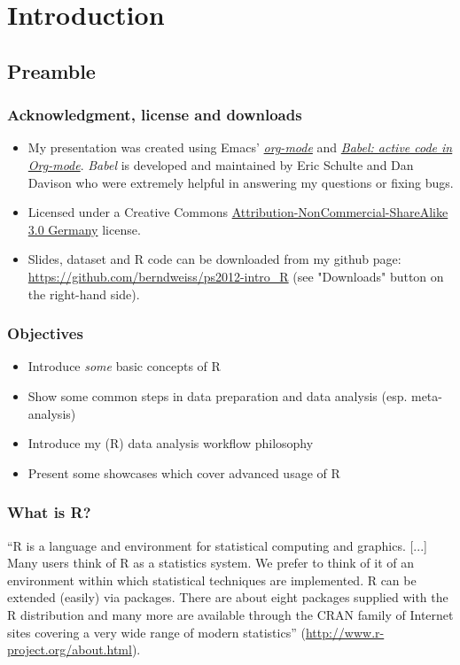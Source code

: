 \documentclass[bigger]{beamer}
\begin{document}
\section{Introduction}
\label{sec-1}
\subsection{Preamble}
\label{sec-1-1}


\begin{frame}\frametitle{Acknowledgment, license and downloads}
\begin{itemize}
\item My presentation was created using Emacs' \href{http://orgmode.org/}{\emph{org-mode}} and
\href{http://orgmode.org/worg/org-contrib/babel/}{\emph{Babel: active code in 
Org-mode}}. \emph{Babel} is developed and maintained by Eric Schulte and Dan Davison who were extremely
helpful in answering my questions or fixing bugs.  
\item Licensed under a Creative Commons
\href{http://creativecommons.org/licenses/by-nc-sa/3.0/de/deed.en}{Attribution-NonCommercial-ShareAlike
3.0 Germany} license. 
\item Slides, dataset and R code can be downloaded from my github page:
\href{https://github.com/berndweiss/ps2012-intro_R}{https://github.com/berndweiss/ps2012-intro\_R} (see
"Downloads" button on the right-hand side). 
\end{itemize}
\end{frame}
\begin{frame}
\frametitle{Objectives}
\label{sec-1-1-1}

\begin{itemize}
\item Introduce \emph{some} basic concepts of R
\item Show some common steps in data preparation and data analysis (esp. meta-analysis)
\item Introduce my (R) data analysis workflow philosophy
\item Present some showcases which cover advanced usage of R
\end{itemize}
\end{frame}
\begin{frame}
\frametitle{What is R?}
\label{sec-1-1-2}

\enquote{R is a language and environment for statistical computing and graphics. [...] Many users think of R
as a statistics system. We prefer to think of it of an environment within which statistical
techniques are implemented. R can be extended (easily) via packages. There are about eight packages
supplied with the R distribution and many more are available through the CRAN family of Internet
sites covering a very wide range of modern statistics} (\href{http://www.r-project.org/about.html}{http://www.r-project.org/about.html}).
\end{frame}
\end{document}
